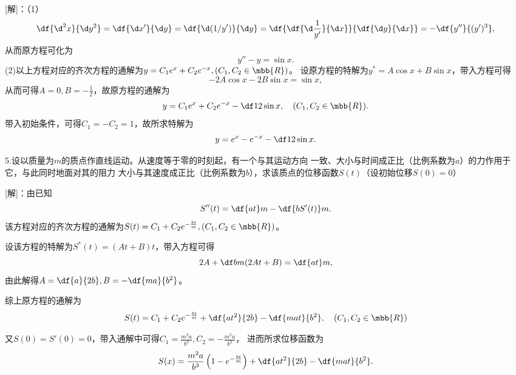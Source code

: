 [解]：（1）
$$\df{\d^2x}{\d y^2}=\df{\d x'}{\d y}
=\df{\d(1/y')}{\d y}=
\df{\df{\d\frac1{y'}}{\d x}}{\df{\d y}{\d x}}=-\df{y''}{(y')^3},$$
从而原方程可化为
$$y''-y=\sin x.$$
(2)以上方程对应的齐次方程的通解为$y=C_1e^x+C_2e^{-x},(C_1,C_2\in\mbb{R})$。
设原方程的特解为$y^*=A\cos x+B\sin x$，带入方程可得
$$-2A\cos x-2B\sin x=\sin x,$$
从而可得$A=0,B=-\frac12$，故原方程的通解为
$$y=C_1e^x+C_2e^{-x}-\df12\sin x,\quad (C_1,C_2\in\mbb{R}).$$
带入初始条件，可得$C_1=-C_2=1$，故所求特解为
$$y=e^x-e^{-x}-\df12\sin x.$$
\fin

\bs

5.设以质量为$m$的质点作直线运动。从速度等于零的时刻起，有一个与其运动方向
一致、大小与时间成正比（比例系数为$a$）的力作用于它，与此同时地面对其的阻力
大小与其速度成正比（比例系数为$b$），求该质点的位移函数$S(t)$（设初始位移$S(0)=0$）

[解]：由已知
$$S''(t)=\df{at}m-\df{bS'(t)}m.$$
该方程对应的齐次方程的通解为$S(t)=C_1+C_2e^{-\frac{bt}m},(C_1,C_2\in\mbb{R})$。

设该方程的特解为$S^*(t)=(At+B)t$，带入方程可得
$$2A+\df bm(2At+B)=\df{at}m,$$
由此解得$A=\df{a}{2b},B=-\df{ma}{b^2}$。

综上原方程的通解为
$$S(t)=C_1+C_2e^{-\frac{bt}m}+\df{at^2}{2b}-\df{mat}{b^2},
\quad (C_1,C_2\in\mbb{R})$$

又$S(0)=S'(0)=0$，带入通解中可得$C_1=\frac{m^2a}{b^3},C_2=-\frac{m^2a}{b^3}$，
进而所求位移函数为
$$S(x)=\frac{m^2a}{b^3}\left(1-e^{-\frac{bt}m}\right)
+\df{at^2}{2b}-\df{mat}{b^2}.$$
\fin

